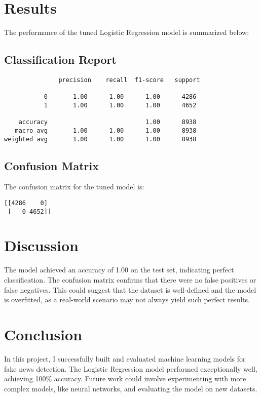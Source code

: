 \documentclass[12pt]{article}
\begin{document}
\section{Results}
The performance of the tuned Logistic Regression model is summarized below:

\subsection{Classification Report}
\begin{verbatim}
               precision    recall  f1-score   support

           0       1.00      1.00      1.00      4286
           1       1.00      1.00      1.00      4652

    accuracy                           1.00      8938
   macro avg       1.00      1.00      1.00      8938
weighted avg       1.00      1.00      1.00      8938
\end{verbatim}

\subsection{Confusion Matrix}
The confusion matrix for the tuned model is:

\begin{verbatim}
[[4286    0]
 [   0 4652]]
\end{verbatim}


\section{Discussion}
The model achieved an accuracy of 1.00 on the test set, indicating perfect classification. The confusion matrix confirms that there were no false positives or false negatives. This could suggest that the dataset is well-defined and the model is overfitted, as a real-world scenario may not always yield such perfect results.


\section{Conclusion}
In this project, I successfully built and evaluated machine learning models for fake news detection. The Logistic Regression model performed exceptionally well, achieving 100\% accuracy. Future work could involve experimenting with more complex models, like neural networks, and evaluating the model on new datasets.
\end{document}
